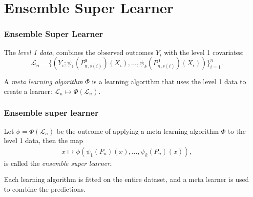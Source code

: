 \documentclass{beamer}
\newcommand{\ml}{k}
\newcommand{\la}{\psi}
\newcommand{\lone}{\mathcal{L}}
\newcommand{\meta}{\phi}
\newcommand{\Meta}{\Phi}
\newcommand{\esl}{\Sigma}
\begin{document}
\section{Ensemble Super Learner}
\begin{frame}
  \frametitle{Ensemble Super Learner}
    \begin{definition}
      The \textit{level 1 data},
      combines the observed outcomes $ Y_i $ with the level 1 covariates:
    \begin{equation*}
        \lone_{n}= \{(Y_i; \la_1(P_{n, s(i)}^{0})(X_i), \ldots, \la_\ml(P_{n, s(i)}^{0})(X_i)) \}_{i = 1}^n. 
    \end{equation*}
  \end{definition}
  \vfill
    \begin{definition}
        A \textit{meta learning algorithm} $ \Meta $ is a learning algorithm that uses the level 1 data to create a learner: $ \lone_{n} \mapsto \Meta(\lone_{n})$. 
    \end{definition}
\end{frame}
\begin{frame}\frametitle{Ensemble super learner}
\begin{definition}
    Let $ \meta = \Meta(\lone_{n}) $ be the outcome of applying a meta learning algorithm $ \Meta $ to the level 1 data, then the map 
    \begin{align*}
       x \mapsto \meta(\la_1(P_{n})(x), \ldots, \la_k(P_{n})(x) ),
    \end{align*}
    is called the \textit{ensemble super learner}.%
  \end{definition}
  \vfill
Each learning algorithm is fitted on the entire dataset, and a meta learner is used to combine the predictions.
\end{frame}
\end{document}
